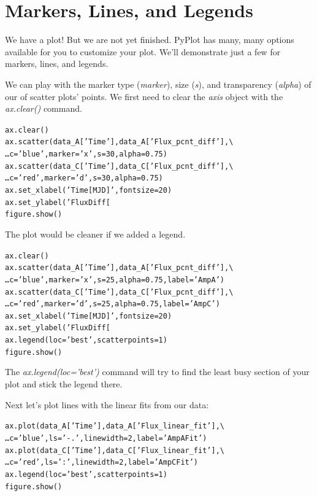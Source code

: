\section{Markers, Lines, and Legends}  %

We have a plot! But we are not yet finished.
PyPlot has many, many options available for you to customize
your plot. We'll demonstrate just a few for markers, lines, and legends. 

We can play with the marker type (\textit{marker}), size (\textit{s}), and 
transparency (\textit{alpha}) of our of scatter plots' points. We first
need to clear the  \textit{axis} object with the \textit{ax.clear()} command.

\begin{alltt}
\pytab ax.clear()
\pytab ax.scatter(data_A['Time'], data_A['Flux_pcnt_diff'], \textbackslash 
\ldots   c='blue', marker='x', s=30, alpha=0.75)
\pytab ax.scatter(data_C['Time'], data_C['Flux_pcnt_diff'], \textbackslash 
\ldots   c='red', marker='d', s=30, alpha=0.75)
\pytab ax.set_xlabel('Time [MJD]', fontsize=20)
\pytab ax.set_ylabel('Flux Diff [%
\pytab figure.show()
\end{alltt}

The plot would be cleaner if we added a legend.

\begin{alltt}
\pytab ax.clear()
\pytab ax.scatter(data_A['Time'], data_A['Flux_pcnt_diff'], \textbackslash 
\ldots   c='blue', marker='x', s=25, alpha=0.75, label='Amp A')
\pytab ax.scatter(data_C['Time'], data_C['Flux_pcnt_diff'], \textbackslash 
\ldots   c='red', marker='d', s=25, alpha=0.75, label='Amp C')
\pytab ax.set_xlabel('Time [MJD]', fontsize=20)
\pytab ax.set_ylabel('Flux Diff [%
\pytab ax.legend(loc='best', scatterpoints=1)
\pytab figure.show()
\end{alltt}

The \textit{ax.legend(loc='best')} command will try to find the least busy section 
of your plot and stick the legend there. 

Next let's plot lines with the linear fits from our data:

\begin{alltt}
\pytab ax.plot(data_A['Time'], data_A['Flux_linear_fit'], \textbackslash 
\ldots  c='blue', ls='-.', linewidth=2, label='Amp A Fit')
\pytab ax.plot(data_C['Time'], data_C['Flux_linear_fit'], \textbackslash 
\ldots  c='red', ls=':', linewidth=2, label='Amp C Fit')
\pytab ax.legend(loc='best', scatterpoints=1)
\pytab figure.show()
\end{alltt}

